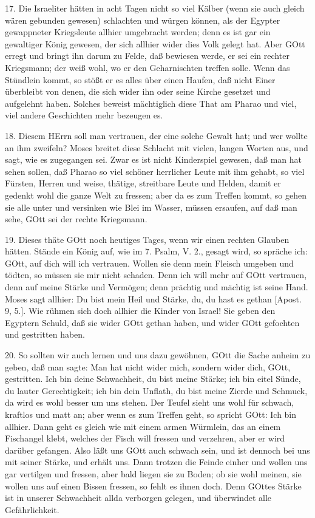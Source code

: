 17. Die Israeliter hätten in acht Tagen nicht so viel Kälber (wenn sie auch gleich wären gebunden gewesen) schlachten und würgen können, als der Egypter gewappneter Kriegsleute allhier umgebracht werden; denn es ist gar ein gewaltiger König gewesen, der sich allhier wider dies Volk gelegt hat. Aber GOtt erregt und bringt ihn darum zu Felde, daß bewiesen werde, er sei ein rechter Kriegsmann; der weiß wohl, wo er den Geharnischten treffen solle. Wenn das Stündlein kommt, so stößt er es alles über einen Haufen, daß nicht Einer überbleibt von denen, die sich wider ihn oder seine Kirche gesetzet und aufgelehnt haben. Solches beweist mächtiglich diese That am Pharao und viel, viel andere Geschichten mehr bezeugen es.

18. Diesem HErrn soll man vertrauen, der eine solche Gewalt hat; und wer wollte an ihm zweifeln? Moses breitet diese Schlacht mit vielen, langen Worten aus, und sagt, wie es zugegangen sei. Zwar es ist nicht Kinderspiel gewesen, daß man hat sehen sollen, daß Pharao so viel schöner herrlicher Leute mit ihm gehabt, so viel Fürsten, Herren und weise, thätige, streitbare Leute und Helden, damit er gedenkt wohl die ganze Welt zu fressen; aber da es zum Treffen kommt, so gehen sie alle unter und versinken wie Blei im Wasser, müssen ersaufen, auf daß man sehe, GOtt sei der rechte Kriegsmann.

19. Dieses thäte GOtt noch heutiges Tages, wenn wir einen rechten Glauben hätten. Stände ein König auf, wie im 7. Psalm, V. 2., gesagt wird, so spräche ich: GOtt, auf dich will ich vertrauen. Wollen sie denn mein Fleisch umgeben und tödten, so müssen sie mir nicht schaden. Denn ich will mehr auf GOtt vertrauen, denn auf meine Stärke und Vermögen; denn prächtig und mächtig ist seine Hand. Moses sagt allhier: Du bist mein Heil und Stärke, du, du hast es gethan [Apost. 9, 5.]. Wie rühmen sich doch allhier die Kinder von Israel! Sie geben den Egyptern Schuld, daß sie wider GOtt gethan haben, und wider GOtt gefochten und gestritten haben.

20. So sollten wir auch lernen und uns dazu gewöhnen, GOtt die Sache anheim zu geben, daß man sagte: Man hat nicht wider mich, sondern wider dich, GOtt, gestritten. Ich bin deine Schwachheit, du bist meine Stärke; ich bin eitel Sünde, du lauter Gerechtigkeit; ich bin dein Unflath, du bist meine Zierde und Schmuck, da wird es wohl besser um uns stehen. Der Teufel sieht uns wohl für schwach, kraftlos und matt an; aber wenn es zum Treffen geht, so spricht GOtt: Ich bin allhier. Dann geht es gleich wie mit einem armen Würmlein, das an einem Fischangel klebt, welches der Fisch will fressen und verzehren, aber er wird darüber gefangen. Also läßt uns GOtt auch schwach sein, und ist dennoch bei uns mit seiner Stärke, und erhält uns. Dann trotzen die Feinde einher und wollen uns gar vertilgen und fressen, aber bald liegen sie zu Boden; ob sie wohl meinen, sie wollen uns auf einen Bissen fressen, so fehlt es ihnen doch. Denn GOttes Stärke ist in unserer Schwachheit allda verborgen gelegen, und überwindet alle Gefährlichkeit.

